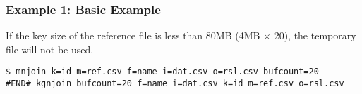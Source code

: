 \subsubsection*{Example 1: Basic Example}

If the key size of the reference file is less than 80MB (4MB × 20), the temporary file will not be used.


\begin{Verbatim}[baselinestretch=0.7,frame=single]
$ mnjoin k=id m=ref.csv f=name i=dat.csv o=rsl.csv bufcount=20
#END# kgnjoin bufcount=20 f=name i=dat.csv k=id m=ref.csv o=rsl.csv
\end{Verbatim}
